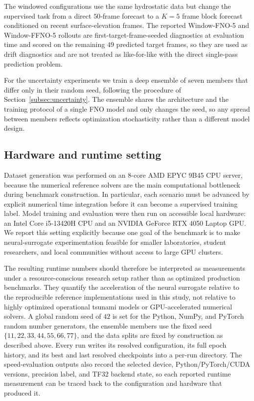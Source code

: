 The windowed configurations use the same hydrostatic data but change the supervised task from a direct $50$-frame forecast to a $K = 5$ frame block forecast conditioned on recent surface-elevation frames. The reported Window-FNO-5 and Window-FFNO-5 rollouts are first-target-frame-seeded diagnostics at evaluation time and scored on the remaining $49$ predicted target frames, so they are used as drift diagnostics and are not treated as like-for-like with the direct single-pass prediction problem.

For the uncertainty experiments we train a deep ensemble of seven members that differ only in their random seed, following the procedure of Section~\ref{subsec:uncertainty}. The ensemble shares the architecture and the training protocol of a single FNO model and only changes the seed, so any spread between members reflects optimization stochasticity rather than a different model design.

\subsection{Hardware and runtime setting}
\label{subsec:train-hardware}

Dataset generation was performed on an 8-core AMD EPYC 9B45 CPU server, because the numerical reference solvers are the main computational bottleneck during benchmark construction. In particular, each scenario must be advanced by explicit numerical time integration before it can become a supervised training label. Model training and evaluation were then run on accessible local hardware: an Intel Core i5-13420H CPU and an NVIDIA GeForce RTX 4050 Laptop GPU. We report this setting explicitly because one goal of the benchmark is to make neural-surrogate experimentation feasible for smaller laboratories, student researchers, and local communities without access to large GPU clusters.

The resulting runtime numbers should therefore be interpreted as measurements under a resource-conscious research setup rather than as optimized production benchmarks. They quantify the acceleration of the neural surrogate relative to the reproducible reference implementations used in this study, not relative to highly optimized operational tsunami models or GPU-accelerated numerical solvers. A global random seed of $42$ is set for the Python, NumPy, and PyTorch random number generators, the ensemble members use the fixed seed $\{11, 22, 33, 44, 55, 66, 77\}$, and the data splits are fixed by construction as described above. Every run writes its resolved configuration, its full epoch history, and its best and last resolved checkpoints into a per-run directory. The speed-evaluation outputs also record the selected device, Python/PyTorch/CUDA versions, precision label, and TF32 backend state, so each reported runtime measurement can be traced back to the configuration and hardware that produced it.
